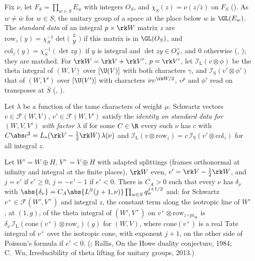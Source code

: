 Fix $\nu$, let $F_S=\prod_{w\in S}E_w$ with integers $O_S$, and $\chi_S(z)=\nu(z/\bar z)$ on $F_S$
(). As $w\ne\bar w$ for $w\in S$, the unitary group
of a space at the place below $w$ is $\GL(E_w)$. The \emph{standard data} of an integral
$p\times\rk W$ matrix $z$ are $\mathrm{row}_z(y)=\chi_S^{-1}\det\bigl(\begin{smallmatrix}z\\y
\end{smallmatrix}\bigr)$ if this matrix is in $\GL(O_S)$, and $\mathrm{col}_z(y)=\chi_S^{-1}(\det zy)$
if $y$ is integral and $\det zy\in O_S^\times$, and $0$ otherwise (,
); they are matched. For $\rk W=\rk V+\rk V'$, $p=\rk V'$, let
$\mathcal I_{\mathrm{L}}(v\otimes\phi)$ be the theta integral of $(W,V)$ over $[\U(V)]$ with both
characters $\gamma$, and $\mathcal I_{\mathrm S}(v'\otimes\phi')$ that of $(W,V')$ over $[\U(V')]$
with characters $\nu\upsilon^{\rk W/2}$, $\upsilon^{p}$ and $\phi'$ read on transposes at $\bar S$
(, ).

\begin{definition}\label{det-exchange:def:rowcol}
Let $\lambda$ be a function of the tame characters of weight $\mu$. Schwartz vectors
$v\in\mathcal F(W,V)$, $v'\in\mathcal F(W,V')$ satisfy the \emph{identity on standard data for
$(W,V,V')$ with factor $\lambda$} if for some $C\in\R$ every such $\nu$ has $c$ with
$C\abs c^2=L_*(\rk V-\tfrac12\rk W)\,\lambda(\nu)$ and
$\mathcal I_{\mathrm L}(v\otimes\mathrm{row}_z)=c\,\mathcal I_{\mathrm S}(v'\otimes\mathrm{col}_z)$
for all integral $z$.
\end{definition}

\begin{fact}\label{det-exchange:fact:tower}
Let $W'=W\oplus H$, $V^+=V\oplus H$ with adapted splittings (frames orthonormal at infinity and
integral at the finite places), $\rk W$ even, $e'=\rk V-\frac12\rk W$, and $j=e'$ if $e'\ge0$,
$j=-e'-1$ if $e'<0$. There is $C_A>0$ such that every $\nu$ has $\delta_\nu$ with
$\abs{\delta_\nu}=C_A\abs{L^S(j+1,\nu)}\prod_{w\in S}q_w^{j+1/2}$ and: for Schwartz
$v^+\in\mathcal F(W',V^+)$ and integral $z$, the constant term along the isotropic line of $W'$, at
$(1,g)$, of the theta integral of $(W',V^+)$ on $v^+\otimes\mathrm{row}_{z\circ\mathrm{pr}_W}$ is
$\delta_\nu\,\mathcal I_{\mathrm L}(\mathrm{cone}(v^+)\otimes\mathrm{row}_{z})(g)$ for $(W,V)$,
where $\mathrm{cone}(v^+)$ is a real Tate integral of $v^+$ over the isotropic cone, with exponent
$j+1$, on the other side of Poisson's formula if $e'<0$.
(; Rallis, On the Howe duality conjecture,
1984; C.~Wu, Irreducibility of theta lifting for unitary groups, 2013.)
\end{fact}

